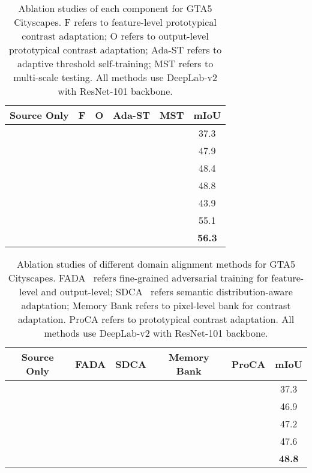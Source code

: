 \documentclass[runningheads]{llncs}
\newcommand{\cmark}{\ding{51}}\newcommand{\xmark}{\ding{55}}\newcommand{\myparagraph}[1]{\medbreak\noindent\textbf{#1}}
\begin{document}
\begin{table}[t!]
\caption{Ablation studies of each component for GTA5  Cityscapes. F refers to feature-level prototypical contrast adaptation; O refers to output-level prototypical contrast adaptation; Ada-ST refers to adaptive threshold self-training; MST refers to multi-scale testing. All methods use DeepLab-v2 with ResNet-101 backbone.}
    \centering
    \begin{tabular}{c c c c c c }
    \toprule
Source Only & F & O  & Ada-ST & MST &mIoU  \\
         \hline
         \cmark & & & &  & 37.3 \\
          \cmark & \cmark & & &  & 47.9 \\
         \cmark & & \cmark & & & 48.4 \\
         \cmark & \cmark & \cmark & & & 48.8 \\\hline
          \cmark & &  & \cmark & &  43.9 \\
         \cmark & \cmark & \cmark & \cmark & & 55.1 \\
         \cmark & \cmark & \cmark & \cmark & \cmark & \textbf{56.3} \\
         \bottomrule
    \end{tabular}
\label{diff_comp}
\end{table}

\begin{table}[t!]
    \caption{Ablation studies of different domain alignment methods for GTA5  Cityscapes. FADA~\cite{wang2020classes} refers fine-grained adversarial training for feature-level and output-level; SDCA~\cite{li2021semantic} refers semantic distribution-aware adaptation; Memory Bank refers to pixel-level bank for contrast adaptation. ProCA refers to prototypical contrast adaptation. All methods use DeepLab-v2 with ResNet-101 backbone.}
    \centering
    \begin{tabular}{cccccc}
    \toprule
         Source Only &  FADA  & SDCA & Memory Bank & ProCA & mIoU  \\
         \hline
         \cmark & &  &  &  & 37.3 \\
         \cmark & \cmark & & & &  46.9 \\
         \cmark & & \cmark & & & 47.2 \\
         \cmark & & & \cmark & & 47.6 \\
         \cmark &  &  & & \cmark & \textbf{48.8} \\
         \bottomrule
    \end{tabular}
    \label{diff_method}
\end{table}
\end{document}
